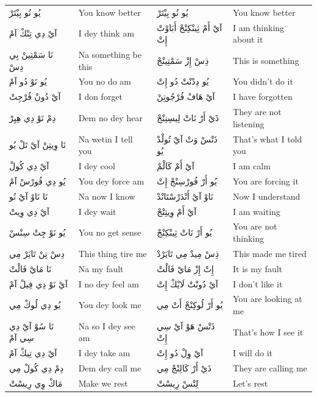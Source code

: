 \documentclass[12pt]{article}
\begin{document}
\begin{longtable}{A p{3.2cm} A p{3.2cm}}
يُو نُو بِيْتَرْ & You know better & يُو نُو بِيْتَرْ & You know better \\
آيْ دِي تِنْكْ آمْ & I dey think am & آيْ أَمْ ثِينْكِنْجْ أَبَاوْتْ إِتْ & I am thinking about it \\
نَا سَمْتِينْ بِي دِسْ & Na something be this & ذِسْ إِزْ سَمْتِينْجْ & This is something \\
يُو نَوْ دُو آمْ & You no do am & يُو دِدْنْتْ دُو إِتْ & You didn’t do it \\
آيْ دُونْ فُرْجِتْ & I don forget & آيْ هَافْ فُرْجُوتِنْ & I have forgotten \\
دِمْ نَوْ دِي هِيِرْ & Dem no dey hear & ذَيْ أَرْ نَاتْ لِيسِنِنْجْ & They are not listening \\
نَا وِيتِنْ آيْ تَلْ يُو & Na wetin I tell you & ذَتْسْ وَتْ آيْ تُولْدْ يُو & That’s what I told you \\
آيْ دِي كُولْ & I dey cool & آيْ أَمْ كَالْمْ & I am calm \\
يُو دِي فُورْسْ آمْ & You dey force am & يُو أَرْ فُورْسِنْجْ إِتْ & You are forcing it \\
نَا نَاوْ آيْ نُو & Na now I know & نَاوْ آيْ أَنْدَرْسْتَانْدْ & Now I understand \\
آيْ دِي وِيتْ & I dey wait & آيْ أَمْ وِيتِنْجْ & I am waiting \\
يُو نَوْ جِتْ سِنْسْ & You no get sense & يُو أَرْ نَاتْ ثِينْكِنْجْ & You are not thinking \\
دِسْ تِنْ تَايَرْ مِي & This thing tire me & ذِسْ مِيدْ مِي تَايَرْدْ & This made me tired \\
نَا مَايْ فَالْتْ & Na my fault & إِتْ إِزْ مَايْ فَالْتْ & It is my fault \\
آيْ نَوْ دِي فِيلْ آمْ & I no dey feel am & آيْ دُونْتْ لَايْكْ إِتْ & I don’t like it \\
يُو دِي لُوكْ مِي & You dey look me & يُو أَرْ لُوكِنْجْ أَتْ مِي & You are looking at me \\
نَا سُوْ آيْ دِي سِي آمْ & Na so I dey see am & ذَتْسْ هَوْ آيْ سِي إِتْ & That’s how I see it \\
آيْ دِي تِيكْ آمْ & I dey take am & آيْ وِلْ دُو إِتْ & I will do it \\
دِمْ دِي كُولْ مِي & Dem dey call me & ذَيْ أَرْ كَالِنْجْ مِي & They are calling me \\
مَاكْ وِي رِيسْتْ & Make we rest & لِتْسْ رِيسْتْ & Let’s rest \\


\end{longtable}
\end{document}
